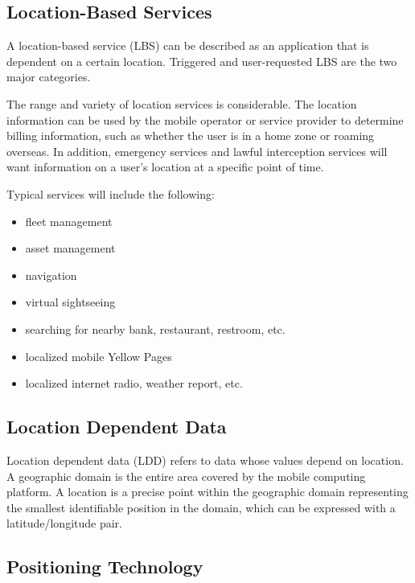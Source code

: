 \documentclass[12pt,a4paper]{article}
\begin{document}
\subsection{Location-Based Services} %
\label{sub:location_based_services}
A location-based service (LBS) can be described as an application that is dependent on a certain location. Triggered and user-requested LBS are the two major categories. \cite{DRoza:2003wz}

The range and variety of location services is considerable. The location information can be used by the mobile operator or service provider to determine billing information, such as whether the user is in a home zone or roaming overseas. In addition, emergency services and lawful interception services will want information on a user's location at a specific point of time. \cite{Adams:2003un}

Typical services will include the following:

\begin{itemize}
	\item fleet management
	\item asset management
	\item navigation
	\item virtual sightseeing
	\item searching for nearby bank, restaurant, restroom, etc.
	\item localized mobile Yellow Pages
	\item localized internet radio, weather report, etc.
\end{itemize}

\subsection{Location Dependent Data} %
\label{sub:location_dependent_data}
Location dependent data (LDD) refers to data whose values depend on location. A geographic domain is the entire area covered by the mobile computing platform. A location is a precise point within the geographic domain representing the smallest identifiable position in the domain, which can be expressed with a latitude/longitude pair.\cite{Dunham:1998ci}

\subsection{Positioning Technology} %
\label{sub:positioning_technology}
\end{document}
